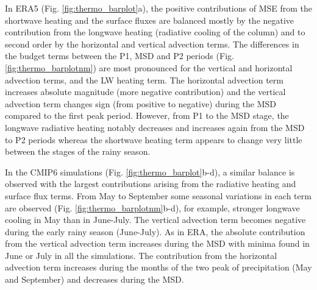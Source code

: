 In ERA5 (Fig. \ref{fig:thermo_barplot}a), the positive contributions of MSE from the shortwave heating and the surface fluxes are balanced mostly by the negative contribution from the longwave heating (radiative cooling of the column)  and to second order by the horizontal and vertical advection terms. 
The differences in the budget terms between the P1, MSD and P2 periods (Fig. \ref{fig:thermo_barplotnm}) are most pronounced for the vertical and horizontal advection terms, and the LW heating term. The horizontal advection term increases absolute magnitude (more negative contribution) and the vertical advection term changes sign (from positive to negative) during the MSD compared to the first peak period. However, from P1 to the MSD stage, the longwave radiative heating notably decreases and increases again from the MSD to P2 periods whereas the shortwave heating term appears to change very little between the stages of the rainy season.

In the CMIP6 simulations (Fig. \ref{fig:thermo_barplot}b-d), a similar balance is observed with the largest contributions arising from the radiative heating and surface flux terms. 
From May to September some seasonal variations in each term are observed (Fig. \ref{fig:thermo_barplotnm}b-d), for example, stronger longwave cooling in May than in June-July. The vertical advection term becomes negative during the early rainy season (June-July). As in ERA, the absolute contribution from the vertical advection term increases during the MSD with minima found in June or July in all the simulations. 
The contribution from the horizontal advection term increases during the months of the two peak of precipitation (May and September) and decreases during the MSD. 


